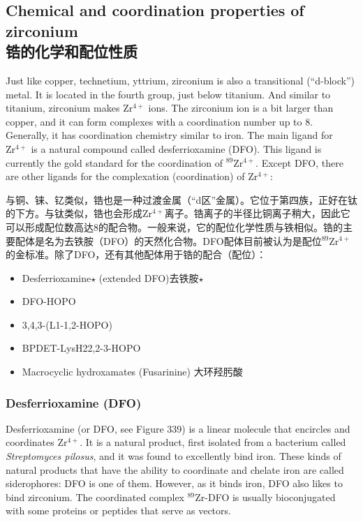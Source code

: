 \documentclass[dvipsnames, svgnames,a4paper,11pt]{article}
\begin{document}
\subsection{Chemical and coordination properties of zirconium\\ 锆的化学和配位性质}  


Just like copper, technetium, yttrium, zirconium is also a transitional (“d-block”) metal. It is located in the fourth group, just below titanium. And similar to titanium, zirconium makes \(\mathrm{Zr^{4+}}\) ions. The zirconium ion is a bit larger than copper, and it can form complexes with a coordination number up to 8. Generally, it has coordination chemistry similar to iron. The main ligand for \(\mathrm{Zr^{4+}}\) is a natural compound called desferrioxamine (DFO). This ligand is currently the gold standard for the coordination of \(\mathrm{^{89}Zr^{4+}}\). Except DFO, there are other ligands for the complexation (coordination) of \(\mathrm{Zr^{4+}}\):

与铜、铼、钇类似，锆也是一种过渡金属（“d区”金属）。它位于第四族，正好在钛的下方。与钛类似，锆也会形成\(\mathrm{Zr^{4+}}\)离子。锆离子的半径比铜离子稍大，因此它可以形成配位数高达8的配合物。一般来说，它的配位化学性质与铁相似。锆的主要配体是名为去铁胺（DFO）的天然化合物。DFO配体目前被认为是配位\(\mathrm{^{89}Zr^{4+}}\)的金标准。除了DFO，还有其他配体用于锆的配合（配位）：

\begin{itemize}
  \item Desferrioxamine$\star$ (extended DFO)去铁胺$\star$
  \item DFO-HOPO
  \item 3,4,3-(L1-1,2-HOPO)
  \item BPDET-LysH22,2-3-HOPO
  \item Macrocyclic hydroxamates (Fusarinine) 大环羟肟酸
\end{itemize}

\subsubsection{Desferrioxamine (DFO)}  
Desferrioxamine (or DFO, see Figure 339) is a linear molecule that encircles and coordinates \(\mathrm{Zr^{4+}}\). It is a natural product, first isolated from a bacterium called \textit{Streptomyces pilosus}, and it was found to excellently bind iron. These kinds of natural products that have the ability to coordinate and chelate iron are called siderophores: DFO is one of them. However, as it binds iron, DFO also likes to bind zirconium. The coordinated complex \(\mathrm{^{89}Zr}\)-DFO is usually bioconjugated with some proteins or peptides that serve as vectors.
\end{document}

